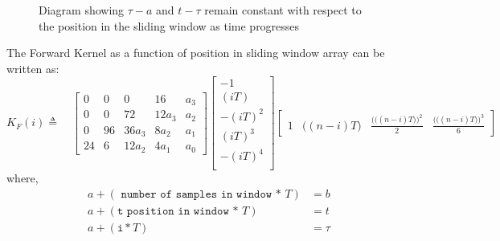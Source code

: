 \documentclass{article}
\begin{document}
\begin{figure}[H]
\begin{centering}
	{
		\caption{Diagram showing $\tau -a$ and $t-\tau$ remain constant with respect to the position in the sliding window as time progresses}
		\label{sliding_array}
	}
\end{centering}
\end{figure}

The Forward Kernel as a function of position in sliding window array can be written as:
\begin{equation}
K_{F}(i) \triangleq \quad
\begin{bmatrix}
0  &  0  &   0   &  16    &   a_3   \\
0  &  0  &   72   & 12a_3  &   a_2  \\
0  &  96 & 36a_3 &  8a_2  &   a_1   \\
24 &  6  & 12a_2 &  4a_1   &   a_0  
\end{bmatrix}
\begin{bmatrix}
  -1     \\
 (iT)    \\
-(iT)^2  \\
 (iT)^3  \\
-(iT)^4  \\
\end{bmatrix}
\begin{bmatrix}
1  & \big((n-i)T\big) & \frac{\Big(\big((n-i)T\big)\Big)^2}{2} & \frac{\Big(\big((n-i)T\big)\Big)^3}{6}
\end{bmatrix}
\label{Kfi}
\end{equation}
where,
\begin{subequations}
\begin{align}
a+ (\texttt{ number of samples in window * } T)&= b \\ 
a+ (\texttt{t position in window * } T) &= t \\
a+ (\texttt{i}*T) &= \tau
\end{align}
\end{subequations}
\end{document}
